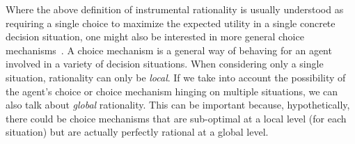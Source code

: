 \documentclass[a4paper]{article}
\begin{document}
%
Where the above definition of instrumental rationality is usually understood as requiring a single choice to maximize the expected utility in a single concrete decision situation, one might also be interested in more general choice mechanisms~\parencite[\emph{e.g.}][]{ZollmanSmead2010:Plasticity-and-,HagenChater2012:Decision-Making,FawcettHamblin2013:Exposing-the-be,GaleazziFranke2016:Smart-Transform}.
A choice mechanism is a general way of behaving for an agent involved in a variety of decision situations.
When considering only a single situation, rationality can only be \emph{local}.
If we take into account the possibility of the agent's choice or choice mechanism hinging on multiple situations, we can also talk about \emph{global} rationality.
This can be important because, hypothetically, there could be choice mechanisms that are sub-optimal at a local level (for each situation) but are actually perfectly rational at a global level.

\end{document}

